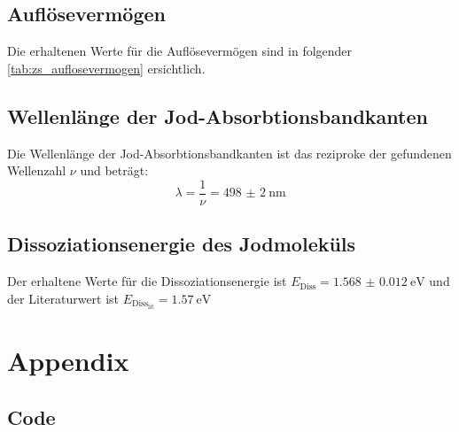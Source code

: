 \documentclass[12pt,english,ngerman]{scrartcl}
\begin{document}
\subsection{Auflösevermögen}

Die erhaltenen Werte für die Auflösevermögen sind in folgender
\autoref{tab:zs_auflosevermogen} ersichtlich.

\subsection{Wellenlänge der Jod-Absorbtionsbandkanten}

Die Wellenlänge der Jod-Absorbtionsbandkanten ist das reziproke der gefundenen
Wellenzahl $\nu$ und beträgt:
\begin{equation*}
	\lambda = \frac{1}{\nu} = \SI{498(2)}{\nano\meter}
\end{equation*}

\subsection{Dissoziationsenergie des Jodmoleküls}

Der erhaltene Werte für die Dissoziationsenergie ist $E_\text{Diss} =
	\SI{1.568(12)}{\electronvolt}$ und der Literaturwert ist
$E_{\text{Diss}_\text{lit}} = \SI{1.57}{\electronvolt}$

\newpage

\section{Appendix}\label{sec:Appendix}
\subsection{Code}\label{sec:code}



\listoffigures
\listoftables
\end{document}
